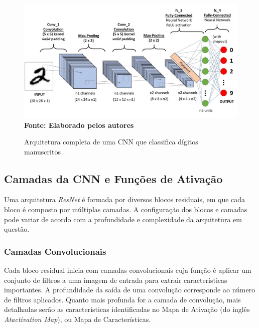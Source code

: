\begin{figure}[ht]
 	\centering	
 	\caption[\hspace{0.1cm}Grade Computacional.]{Arquitetura completa de uma CNN que classifica dígitos manuscritos}
 	\vspace{-0.2cm}
 	\includegraphics[width=1\textwidth]{figuras/cnn.png}
 	\captionsetup{justification=centering}
	\vspace{-0.2cm}
     \\\textbf{\footnotesize Fonte: Elaborado pelos autores}
	\label{fig:cnn}
\end{figure}

\subsection{\esp Camadas da CNN e Funções de Ativação} \label{camadasfund}

Uma arquitetura \textit{ResNet} é formada por diversos blocos residuais, em que cada bloco é composto por múltiplas camadas. A configuração dos blocos e camadas pode variar de acordo com a profundidade e complexidade da arquitetura em questão.

\subsubsection{\esp Camadas Convolucionais} \label{convs}

Cada bloco residual inicia com camadas convolucionais cuja função é aplicar um conjunto de filtros a uma imagem de entrada para extrair características importantes. A profundidade da saída de uma convolução corresponde ao número de filtros aplicados. Quanto mais profunda for a camada de convolução, mais detalhadas serão as características identificadas no Mapa de Ativação (do inglês \textit{Atactivation Map}), ou Mapa de Características. 

